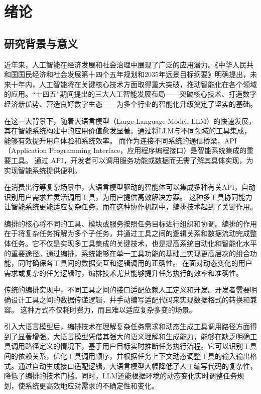
\chapter{绪论}

\section{研究背景与意义}


近年来，人工智能在经济发展和社会治理中展现了广泛的应用潜力。《中华人民共和国国民经济和社会发展第十四个五年规划和2035年远景目标纲要》明确提出，未来十年内，人工智能将在关键核心技术方面取得重大突破，推动智能化在各个领域的应用。“十四五”期间提出的三大人工智能发展布局——突破核心技术、打造数字经济新优势、营造良好数字生态——为多个行业的智能化升级奠定了坚实的基础。

在这一大背景下，随着大语言模型（Large Language Model, LLM）的快速发展，其在智能系统构建中的应用价值愈发显著。通过将LLM与不同领域的工具集成，能够有效提升用户体验和系统效率。
而作为连接不同系统的通信桥梁，API（Application Programming Interface，应用程序编程接口）是智能系统集成的重要工具。
通过 API，开发者可以调用服务功能或数据而无需了解其具体实现，为实现智能系统提供便利。

在消费出行等复杂场景中，大语言模型驱动的智能体可以集成多种有关API，自动识别用户需求并灵活调用工具，为用户提供高效解决方案。
这种多工具协同能力让智能系统更能适应复杂任务。而在这种协作机制中，编排技术起到了关键作用。

编排的核心将不同的工具、模块或服务按照任务目标进行组织和协调。编排的作用在于将复杂任务拆解为多个子任务，并通过工具之间的逻辑关系和数据流动完成整体任务。它不仅是实现多工具集成的关键技术，也是提高系统自动化和智能化水平的重要途径。通过编排，系统能够在单一工具功能的基础上实现更高层次的组合功能，同时确保各工具间的数据交互和逻辑调用的正确性。
在面对动态变化的用户需求或复杂的任务逻辑时，编排技术尤其能够提升任务执行的效率和准确性。

传统的编排实现中，不同工具之间的接口适配依赖人工定义和开发。开发者需要明确设计工具之间的数据传递逻辑，并手动编写适配代码来实现数据格式的转换和兼容。
这种方式不仅耗时费力，而且难以适应复杂多变的场景。

引入大语言模型后，编排技术在理解复杂任务需求和动态生成工具调用路径方面得到了显著增强。大语言模型凭借其强大的语义理解和生成能力，能够在缺乏明确工具调用路径定义的情况下，基于用户目标实时推断任务执行流程。它可以识别工具间的依赖关系，优化工具调用顺序，并根据任务上下文动态调整工具的输入输出格式。通过自动生成接口适配逻辑，大语言模型大幅降低了人工编写代码的复杂性，降低了编排的技术门槛。同时，LLM还能根据环境的动态变化实时调整任务规划，使系统更高效地应对需求的不确定性和变化。

